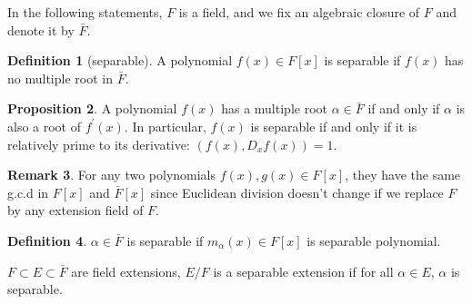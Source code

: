 \documentclass[a4paper,12pt]{article}
\newcommand{\p}{^{\prime}}
\theoremstyle{definition}
\newtheorem{defn}{Definition}[subsection]
\newtheorem{rema}[defn]{Remark}
\newtheorem{prop}[defn]{Proposition}
\begin{document}
\newpage
In the following statements, $F$ is a field, and we fix an algebraic closure of $F$ and denote it by $\bar{F}$.
\begin{defn}[separable]
    A polynomial $f(x)\in F[x]$ is separable if $f(x)$ has no multiple root in $\bar{F}$.
\end{defn}
\begin{prop}
    A polynomial $f(x)$ has a multiple root $\alpha\in \bar{F}$ if and only if $\alpha$ is also a root of $f\p(x)$. In particular, $f(x)$ is separable if and only if it is relatively prime to its derivative: $\left(f(x), D_x f(x)\right)=1$.
    \label{proposition: criterion for separable polynomial}
\end{prop}
\begin{rema}
    For any two polynomials $f(x),g(x)\in F[x]$, they have the same g.c.d in $F[x]$ and $\bar{F}[x]$ since Euclidean division doesn't change if we replace $F$ by any extension field of $F$.
\end{rema}

\begin{defn}
    $\alpha\in \bar{F}$ is separable if $m_{\alpha}(x)\in F[x]$ is separable polynomial.

    $F\subset E\subset \bar{F}$ are field extensions, $E/F$ is a separable extension if for all $\alpha \in E$, $\alpha$ is separable.
\end{defn}
\end{document}
